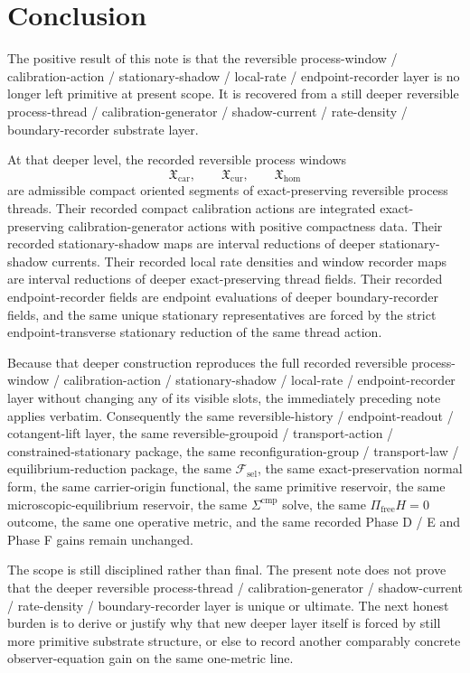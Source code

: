 \documentclass[11pt]{article}
\newcommand{\StemFunctional}{\mathscr F_{\mathrm{sel}}}
\newcommand{\TensorWindowClass}{\mathfrak X_{\mathrm{car}}}
\newcommand{\CurWindowClass}{\mathfrak X_{\mathrm{cur}}}
\newcommand{\HomWindowClass}{\mathfrak X_{\mathrm{hom}}}
\begin{document}
\section{Conclusion}

The positive result of this note is that the reversible process-window / calibration-action / stationary-shadow / local-rate / endpoint-recorder layer is no longer left primitive at present scope. It is recovered from a still deeper reversible process-thread / calibration-generator / shadow-current / rate-density / boundary-recorder substrate layer.

At that deeper level, the recorded reversible process windows
\[
\TensorWindowClass,\qquad
\CurWindowClass,\qquad
\HomWindowClass
\]
are admissible compact oriented segments of exact-preserving reversible process threads. Their recorded compact calibration actions are integrated exact-preserving calibration-generator actions with positive compactness data. Their recorded stationary-shadow maps are interval reductions of deeper stationary-shadow currents. Their recorded local rate densities and window recorder maps are interval reductions of deeper exact-preserving thread fields. Their recorded endpoint-recorder fields are endpoint evaluations of deeper boundary-recorder fields, and the same unique stationary representatives are forced by the strict endpoint-transverse stationary reduction of the same thread action.

Because that deeper construction reproduces the full recorded reversible process-window / calibration-action / stationary-shadow / local-rate / endpoint-recorder layer without changing any of its visible slots, the immediately preceding note applies verbatim. Consequently the same reversible-history / endpoint-readout / cotangent-lift layer, the same reversible-groupoid / transport-action / constrained-stationary package, the same reconfiguration-group / transport-law / equilibrium-reduction package, the same \(\StemFunctional\), the same exact-preservation normal form, the same carrier-origin functional, the same primitive reservoir, the same microscopic-equilibrium reservoir, the same \(\Sigma^{\mathrm{cmp}}\) solve, the same \(\Pi_{\mathrm{free}}H=0\) outcome, the same one operative metric, and the same recorded Phase D / E and Phase F gains remain unchanged.

The scope is still disciplined rather than final. The present note does not prove that the deeper reversible process-thread / calibration-generator / shadow-current / rate-density / boundary-recorder layer is unique or ultimate. The next honest burden is to derive or justify why that new deeper layer itself is forced by still more primitive substrate structure, or else to record another comparably concrete observer-equation gain on the same one-metric line.
\end{document}
